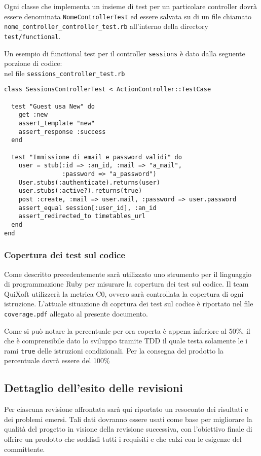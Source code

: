 \documentclass[11pt,a4paper]{article}
\begin{document}
Ogni classe che implementa un insieme di test per un particolare controller dovrà essere denominata \verb|NomeControllerTest| ed essere salvata su di un file chiamato \verb|nome_controller_controller_test.rb| all'interno della directory \verb|test/functional|.

Un esempio di functional test per il controller \verb|sessions| è dato dalla seguente porzione di codice: \\
nel file \verb|sessions_controller_test.rb|
\begin{verbatim}
class SessionsControllerTest < ActionController::TestCase

  test "Guest usa New" do
    get :new
    assert_template "new"
    assert_response :success
  end

  test "Immissione di email e password validi" do
    user = stub(:id => :an_id, :mail => "a_mail",
                :password => "a_password")
    User.stubs(:authenticate).returns(user)
    user.stubs(:active?).returns(true)
    post :create, :mail => user.mail, :password => user.password
    assert_equal session[:user_id], :an_id
    assert_redirected_to timetables_url
  end
end
\end{verbatim}
\subsubsection{Copertura dei test sul codice}
Come descritto precedentemente sarà utilizzato uno strumento per il linguaggio di programmazione Ruby per misurare la copertura dei test sul codice. Il team QuiXoft utilizzerà la metrica C0, ovvero sarà controllata la copertura di ogni istruzione. L'attuale situazione di coprtura dei test sul codice è riportato nel file \verb|coverage.pdf| allegato al presente documento.

Come si può notare la percentuale per ora coperta è appena inferiore al 50\%, il che è comprensibile dato lo sviluppo tramite TDD il quale testa solamente le i rami \verb|true| delle istruzioni condizionali. Per la consegna del prodotto la percentuale dovrà essere del 100\%
\subsection{Dettaglio dell'esito delle revisioni}
Per ciascuna revisione affrontata sarà qui riportato un resoconto dei risultati e dei problemi emersi. Tali dati dovranno essere usati come base per migliorare la qualità del progetto in visione della revisione successiva, con l'obiettivo finale di offrire un prodotto che soddisfi tutti i requisiti e che calzi con le esigenze del committente.
\end{document}
